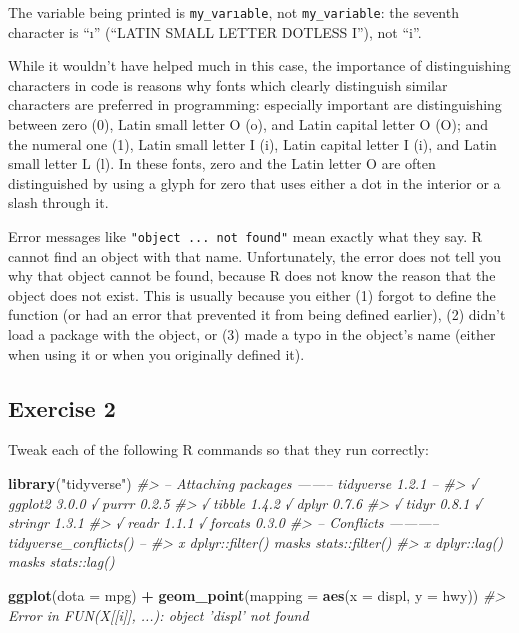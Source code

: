 \documentclass[]{book}
\newenvironment{Shaded}{\begin{snugshade}}{\end{snugshade}}
\newcommand{\CommentTok}[1]{\textcolor[rgb]{0.56,0.35,0.01}{\textit{#1}}}
\newcommand{\DataTypeTok}[1]{\textcolor[rgb]{0.13,0.29,0.53}{#1}}
\newcommand{\KeywordTok}[1]{\textcolor[rgb]{0.13,0.29,0.53}{\textbf{#1}}}
\newcommand{\NormalTok}[1]{#1}
\newcommand{\OperatorTok}[1]{\textcolor[rgb]{0.81,0.36,0.00}{\textbf{#1}}}
\newcommand{\StringTok}[1]{\textcolor[rgb]{0.31,0.60,0.02}{#1}}
\theoremstyle{plain}
\theoremstyle{remark}
\theoremstyle{definition}
\theoremstyle{definition}
\theoremstyle{definition}
\theoremstyle{remark}
\begin{document}
The variable being printed is \texttt{my\_varıable}, not
\texttt{my\_variable}: the seventh character is ``ı'' (``LATIN SMALL
LETTER DOTLESS I''), not ``i''.

While it wouldn't have helped much in this case, the importance of
distinguishing characters in code is reasons why fonts which clearly
distinguish similar characters are preferred in programming: especially
important are distinguishing between zero (0), Latin small letter O (o),
and Latin capital letter O (O); and the numeral one (1), Latin small
letter I (i), Latin capital letter I (i), and Latin small letter L (l).
In these fonts, zero and the Latin letter O are often distinguished by
using a glyph for zero that uses either a dot in the interior or a slash
through it.

Error messages like
\texttt{"object\ \textquotesingle{}...\textquotesingle{}\ not\ found"}
mean exactly what they say. R cannot find an object with that name.
Unfortunately, the error does not tell you why that object cannot be
found, because R does not know the reason that the object does not
exist. This is usually because you either (1) forgot to define the
function (or had an error that prevented it from being defined earlier),
(2) didn't load a package with the object, or (3) made a typo in the
object's name (either when using it or when you originally defined it).

\hypertarget{exercise-2-4}{%
\subsection{Exercise 2}\label{exercise-2-4}}

Tweak each of the following R commands so that they run correctly:

\begin{Shaded}
\begin{Highlighting}[]
\KeywordTok{library}\NormalTok{(}\StringTok{"tidyverse"}\NormalTok{)}
\CommentTok{#> -- Attaching packages -------- tidyverse 1.2.1 --}
\CommentTok{#> √ ggplot2 3.0.0     √ purrr   0.2.5}
\CommentTok{#> √ tibble  1.4.2     √ dplyr   0.7.6}
\CommentTok{#> √ tidyr   0.8.1     √ stringr 1.3.1}
\CommentTok{#> √ readr   1.1.1     √ forcats 0.3.0}
\CommentTok{#> -- Conflicts ----------- tidyverse_conflicts() --}
\CommentTok{#> x dplyr::filter() masks stats::filter()}
\CommentTok{#> x dplyr::lag()    masks stats::lag()}

\KeywordTok{ggplot}\NormalTok{(}\DataTypeTok{dota =}\NormalTok{ mpg) }\OperatorTok{+}
\StringTok{  }\KeywordTok{geom_point}\NormalTok{(}\DataTypeTok{mapping =} \KeywordTok{aes}\NormalTok{(}\DataTypeTok{x =}\NormalTok{ displ, }\DataTypeTok{y =}\NormalTok{ hwy))}
\CommentTok{#> Error in FUN(X[[i]], ...): object 'displ' not found}
\end{Highlighting}
\end{Shaded}
\end{document}
